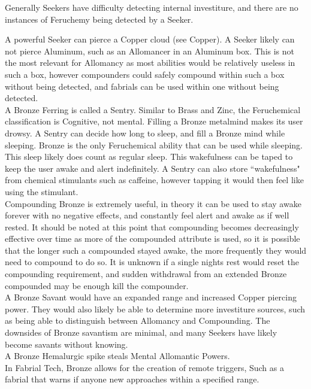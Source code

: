 \documentclass[conference]{IEEEtran}
\begin{document}
Generally Seekers have difficulty detecting internal investiture, and there are no instances of Feruchemy being detected by a Seeker. 

A powerful Seeker can pierce a Copper cloud (see Copper).
A Seeker likely can not pierce Aluminum, such as an Allomancer in an Aluminum box.  This is not the most relevant for Allomancy as most abilities would be relatively useless in such a box, however compounders could safely compound within such a box without being detected, and fabrials can be used within one without being detected.\\

A Bronze Ferring is called a Sentry.  Similar to Brass and Zinc, the Feruchemical classification is Cognitive, not mental.  Filling a Bronze metalmind makes its user drowsy.  A Sentry can decide how long to sleep, and fill a Bronze mind while sleeping. Bronze is the only Feruchemical ability that can be used while sleeping. This sleep likely does count as regular sleep.  This wakefulness can be taped to keep the user awake and alert indefinitely.  A Sentry can also store ``wakefulness" from chemical stimulants such as caffeine, however tapping it would then feel like using the stimulant.\\

Compounding Bronze is extremely useful, in theory it can be used to stay awake forever with no negative effects, and constantly feel alert and awake as if well rested.  It should be noted at this point that compounding becomes decreasingly effective over time as more of the compounded attribute is used, so it is possible that the longer such a compounded stayed awake, the more frequently they would need to compound to do so.  It is unknown if a single nights rest would reset the compounding requirement, and sudden withdrawal from an extended Bronze compounded may be enough kill the compounder.\\

A Bronze Savant would have an expanded range and increased Copper piercing power.  They would also likely be able to determine more investiture sources, such as being able to distinguish between Allomancy and Compounding.
The downsides of Bronze savantism are minimal, and many Seekers have likely become savants without knowing.\\

A Bronze Hemalurgic spike steals Mental Allomantic Powers.\\

In Fabrial Tech, Bronze allows for the creation of remote triggers,  Such as a fabrial that warns if anyone new approaches within a specified range.
\end{document}
